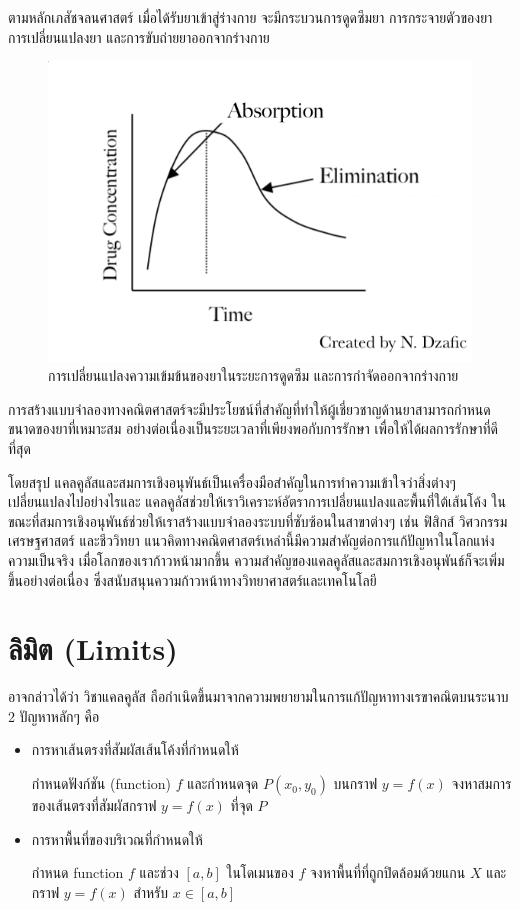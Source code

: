 \documentclass[
]{book}
\theoremstyle{definition}
\theoremstyle{definition}
\theoremstyle{definition}
\theoremstyle{definition}
\theoremstyle{remark}
\begin{document}
ตามหลักเภสัชจลนศาสตร์ เมื่อได้รับยาเข้าสู่ร่างกาย จะมีกระบวนการดูดซึมยา การกระจายตัวของยา การเปลี่ยนแปลงยา และการขับถ่ายยาออกจากร่างกาย

\begin{figure}
\includegraphics[width=0.5\linewidth]{images/fig-drub-absorption} \caption{การเปลี่ยนแปลงความเข้มข้นของยาในระยะการดูดซึม และการกำจัดออกจากร่างกาย}\label{fig:fig-drub-absorption}
\end{figure}

การสร้างแบบจำลองทางคณิตศาสตร์จะมีประโยชน์ที่สำคัญที่ทำให้ผู้เชี่ยวชาญด้านยาสามารถกำหนดขนาดของยาที่เหมาะสม อย่างต่อเนื่องเป็นระยะเวลาที่เพียงพอกับการรักษา เพื่อให้ได้ผลการรักษาที่ดีที่สุด

โดยสรุป แคลคูลัสและสมการเชิงอนุพันธ์เป็นเครื่องมือสำคัญในการทำความเข้าใจว่าสิ่งต่างๆ เปลี่ยนแปลงไปอย่างไรและ แคลคูลัสช่วยให้เราวิเคราะห์อัตราการเปลี่ยนแปลงและพื้นที่ใต้เส้นโค้ง ในขณะที่สมการเชิงอนุพันธ์ช่วยให้เราสร้างแบบจำลองระบบที่ซับซ้อนในสาขาต่างๆ เช่น ฟิสิกส์ วิศวกรรม เศรษฐศาสตร์ และชีววิทยา แนวคิดทางคณิตศาสตร์เหล่านี้มีความสำคัญต่อการแก้ปัญหาในโลกแห่งความเป็นจริง เมื่อโลกของเราก้าวหน้ามากขึ้น ความสำคัญของแคลคูลัสและสมการเชิงอนุพันธ์ก็จะเพิ่มขึ้นอย่างต่อเนื่อง ซึ่งสนับสนุนความก้าวหน้าทางวิทยาศาสตร์และเทคโนโลยี

\chapter{ลิมิต (Limits)}\label{uxe25uxe21uxe15-limits}

อาจกล่าวได้ว่า วิชาแคลคูลัส
ถือกำเนิดขึ้นมาจากความพยายามในการแก้ปัญหาทางเรขาคณิตบนระนาบ 2 ปัญหาหลักๆ คือ

\begin{itemize}
\item
  การหาเส้นตรงที่สัมผัสเส้นโค้งที่กำหนดให้

  กำหนดฟังก์ชัน (function) \(f\) และกำหนดจุด \(P(x_{0},y_{0})\) บนกราฟ
  \(y = f(x)\) จงหาสมการของเส้นตรงที่สัมผัสกราฟ \(y = f(x)\) ที่จุด \(P\)
\item
  การหาพื้นที่ของบริเวณที่กำหนดให้

  กำหนด function \(f\) และช่วง \([a,b]\) ในโดเมนของ \(f\)
  จงหาพื้นที่ที่ถูกปิดล้อมด้วยแกน \(X\) และกราฟ \(y = f(x)\) สำหรับ \(x \in [a,b]\)
\end{itemize}
\end{document}
